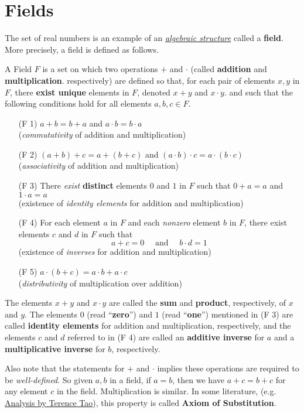 \section{Fields} \label{sec 8.c}

The set of real numbers is an example of an \href{https://www.wikiwand.com/en/Algebraic_structure}{\emph{algebraic structure}} called a \textbf{field}.
More precisely, a field is defined as follows.

\begin{appendix definition} \label{def c.1}
A Field \(F\) is a set on which two operations \(+\) and \(\cdot\) (called \textbf{addition} and \textbf{multiplication}. respectively) are defined so that, for each pair of elements \(x, y\) in \(F\), there \textbf{exist unique} elements in \(F\), denoted \(x + y\) and \(x \cdot y\).
and such that the following conditions hold for all elements \(a, b, c \in F\).
\begin{enumerate}
\item [(F 1)] \(a + b = b + a\) and \(a \cdot b = b \cdot a\) \\
    (\emph{commutativity} of addition and multiplication)
\item [(F 2)] \((a + b) + c = a + (b + c)\) and \((a \cdot b) \cdot c = a \cdot (b \cdot c)\) \\
    (\emph{associativity} of addition and multiplication)
\item [(F 3)] There \emph{exist} \textbf{distinct} elements \(0\) and \(1\) in \(F\) such that \(0 + a = a\) and \(1 \cdot a = a\) \\
    (existence of \emph{identity elements} for addition and multiplication)
\item [(F 4)] For each element \(a\) in \(F\) and each \emph{nonzero} element \(b\) in \(F\), there exist elements \(c\) and \(d\) in \(F\) such that
\[
    a + c = 0 \quad \text{ and } \quad b \cdot d = 1
\]
    (existence of \emph{inverses} for addition and multiplication)
\item [(F 5)] \(a \cdot (b + c) = a \cdot b + a \cdot c\) \\
    (\emph{distributivity} of multiplication over addition)
\end{enumerate}
The elements \(x + y\) and \(x \cdot y\) are called the \textbf{sum} and \textbf{product}, respectively, of \(x\) and \(y\).
The elements \(0\) (read ``\textbf{zero}'') and \(1\) (read ``\textbf{one}'') mentioned in (F 3) are called \textbf{identity elements} for addition and multiplication, respectively,
and the elements \(c\) and \(d\) referred to in (F 4) are called an \textbf{additive inverse} for \(a\) and a \textbf{multiplicative inverse} for \(b\), respectively.

Also note that the statements for \(+\) and \(\cdot\) implies these operations are required to be \emph{well-defined}.
So given \(a, b\) in a field, if \(a = b\), then we have \(a + c = b + c\) for any element \(c\) in the field.
Multiplication is similar.
In some literature, (e.g. \href{https://terrytao.wordpress.com/books/analysis-i/}{Analysis by Terence Tao}), this property is called \textbf{Axiom of Substitution}.
\end{appendix definition}

